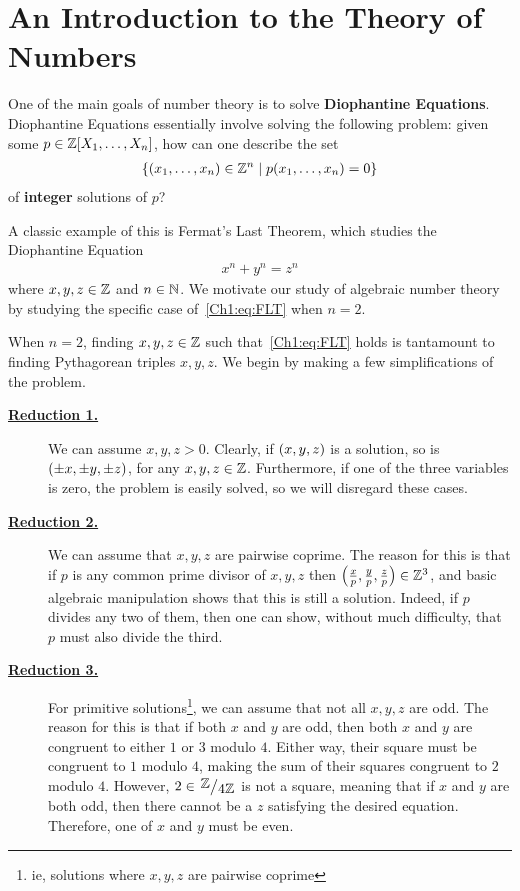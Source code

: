 \chapter{An Introduction to the Theory of Numbers}\label{Ch1:CH}
\thispagestyle{empty}

One of the main goals of number theory is to solve \textbf{Diophantine Equations}. Diophantine Equations essentially involve solving the following problem: given some $p \in \mathbb{Z}\!\left[ X_1, \ldots, X_n \right]$, how can one describe the set
\begin{align*}
    \left\{ \left( x_1, \ldots, x_n \right) \in \mathbb{Z}^n \; \middle\vert \; p\!\left( x_1, \ldots, x_n \right) = 0 \right\}
\end{align*}
of \textbf{integer} solutions of $p$?

A classic example of this is Fermat's Last Theorem, which studies the Diophantine Equation
\begin{align}
    x^n + y^n = z^n
    \label{Ch1:eq:FLT}
\end{align}
where $x, y, z \in \mathbb{Z}$ and $n \in \mathbb{N}$. We motivate our study of algebraic number theory by studying the specific case of~\eqref{Ch1:eq:FLT} when $n = 2$.

When $n = 2$, finding $x, y, z \in \mathbb{Z}$ such that~\eqref{Ch1:eq:FLT} holds is tantamount to finding Pythagorean triples $x, y, z$. We begin by making a few simplifications of the problem.

\begin{description}
    \item[\textbf{\underline{Reduction 1.}}] We can assume $x, y, z > 0$. Clearly, if $\left( x, y, z \right)$ is a solution, so is $\left( \pm x, \pm y, \pm z \right)$, for any $x, y, z \in \mathbb{Z}$. Furthermore, if one of the three variables is zero, the problem is easily solved, so we will disregard these cases.

    \item[\textbf{\underline{Reduction 2.}}] We can assume that $x, y, z$ are pairwise coprime. The reason for this is that if $p$ is any common prime divisor of $x, y, z$ then $\left( \frac{x}{p}, \frac{y}{p}, \frac{z}{p} \right) \in \mathbb{Z}^3$, and basic algebraic manipulation shows that this is still a solution. Indeed, if $p$ divides any two of them, then one can show, without much difficulty, that $p$ must also divide the third.

    \item[\textbf{\underline{Reduction 3.}}] For primitive solutions\footnote{ie, solutions where $x, y, z$ are pairwise coprime}, we can assume that not all $x, y, z$ are odd. The reason for this is that if both $x$ and $y$ are odd, then both $x$ and $y$ are congruent to either $1$ or $3$ modulo $4$. Either way, their square must be congruent to $1$ modulo $4$, making the sum of their squares congruent to $2$ modulo $4$. However, $2 \in \quotient{\Z}{4\Z}$ is not a square, meaning that if $x$ and $y$ are both odd, then there cannot be a $z$ satisfying the desired equation. Therefore, one of $x$ and $y$ must be even.
\end{description}

